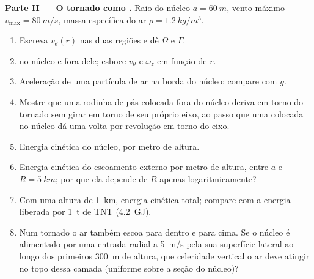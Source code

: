 \begin{problem}
\medskip
\noindent\textbf{Parte II --- O tornado como .}
Raio do núcleo $a = \qty{60}{m}$, vento máximo $v_{\max} = \qty{80}{m/s}$, massa
específica do ar $\rho = \qty{1.2}{kg/m^3}$.
\begin{enumerate}[resume]
  \item Escreva $v_\theta(r)$ nas duas regiões e dê $\Omega$ e $\Gamma$.
  \item {} no núcleo e fora dele; esboce $v_\theta$ e $\omega_z$
        em função de $r$.
  \item Aceleração de uma partícula de ar na borda do núcleo;
        compare com $g$.
  \item Mostre que uma rodinha de pás colocada fora do núcleo deriva
        em torno do tornado sem girar em torno de seu próprio eixo, ao passo que
        uma colocada no núcleo dá uma volta por revolução em torno do
        eixo.
  \item Energia cinética do núcleo, por metro de altura.
  \item Energia cinética do escoamento externo por metro de altura, entre
        $a$ e $R = \qty{5}{km}$; por que ela depende de $R$ apenas
        logaritmicamente?
  \item Com uma altura de \qty{1}{km}, energia cinética total; compare com
        a energia liberada por \qty{1}{t} de TNT (\qty{4.2}{GJ}).
  \item Num tornado o ar também escoa para dentro e para cima. Se o núcleo
        é alimentado por uma entrada radial a \qty{5}{m/s} pela sua superfície
        lateral ao longo dos primeiros \qty{300}{m} de altura, que celeridade
        vertical o ar deve atingir no topo dessa camada (uniforme
        sobre a seção do núcleo)?
\end{enumerate}


\end{problem}
